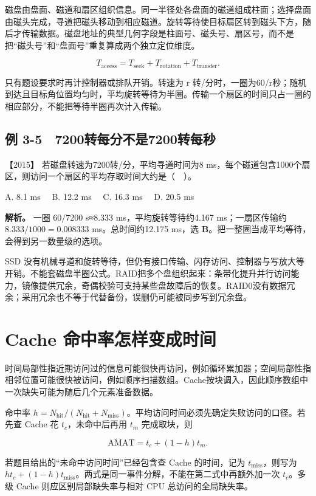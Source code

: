 磁盘由盘面、磁道和扇区组织信息。同一半径处各盘面的磁道组成柱面；选择盘面由磁头完成，寻道把磁头移动到相应磁道。旋转等待使目标扇区转到磁头下方，随后才传输数据。磁盘地址的典型几何字段是柱面号、磁头号、扇区号，而不是把``磁头号''和``盘面号''重复算成两个独立定位维度。

\[
T_{\mathrm{access}}=T_{\mathrm{seek}}+T_{\mathrm{rotation}}+T_{\mathrm{transfer}}.
\]

只有题设要求时再计控制器或排队开销。转速为 r 转/分时，一圈为60/r秒；随机到达且目标角位置均匀时，平均旋转等待为半圈。传输一个扇区的时间只占一圈的相应部分，不能把等待半圈再次计入传输。

\subsection{例 3-5　7200转每分不是7200转每秒}\label{co-ex3-5}

\noindent{}【2015】 若磁盘转速为7200转/分，平均寻道时间为8 ms，每个磁道包含1000个扇区，则访问一个扇区的平均存取时间大约是（　）。

A. 8.1 ms　 B. 12.2 ms　 C. 16.3 ms　 D. 20.5 ms


\textbf{解析。} 一圈 \(60/7200\) s≈8.333 ms，平均旋转等待约4.167 ms；一扇区传输约 \(8.333/1000=0.008333\) ms。总时间约12.175 ms，选 \textbf{B}。把一整圈当成平均等待，会得到另一数量级的选项。

SSD 没有机械寻道和旋转等待，但仍有接口传输、闪存访问、控制器与写放大等开销。不能套磁盘半圈公式。RAID把多个盘组织起来：条带化提升并行访问能力，镜像提供冗余，奇偶校验可支持某些盘故障后的恢复。RAID0没有数据冗余；采用冗余也不等于代替备份，误删仍可能被同步写到冗余盘。

\section{Cache 命中率怎样变成时间}\label{co-03-07}

时间局部性指近期访问过的信息可能很快再访问，例如循环累加器；空间局部性指相邻位置可能很快被访问，例如顺序扫描数组。Cache按块调入，因此顺序数组中一次缺失可能为随后几个元素准备数据。

命中率 \(h=N_{\mathrm{hit}}/(N_{\mathrm{hit}}+N_{\mathrm{miss}})\)。平均访问时间必须先确定失败访问的口径。若先查 Cache 花 \(t_c\)，未命中后再用 \(t_m\) 完成取块，则

\[
\mathrm{AMAT}=t_c+(1-h)t_m.
\]

若题目给出的``未命中访问时间''已经包含查 Cache 的时间，记为 \(t_{\mathrm{miss}}\)，则写为 \(ht_c+(1-h)t_{\mathrm{miss}}\)。两式是同一事件分解，不能在第二式中再额外加一次 \(t_c\)。多级 Cache 则应区别局部缺失率与相对 CPU 总访问的全局缺失率。

